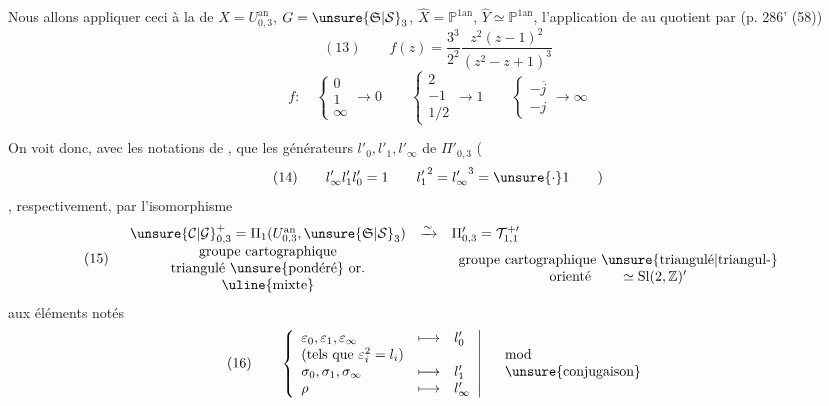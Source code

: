 Nous allons appliquer ceci à la  de
$X=U_{0,3}^{\mathrm{an}}$, $G=\unsure{\mathfrak{S}|\mathcal{S}}_3$,
$\widehat{X}=\mathbb{P}^{1\mathrm{an}}$, $\widehat{Y}\simeq\mathbb{P}^{1\mathrm{an}}$,
 l'application de  au quotient
 par (p. 286' (58))
\[
(13)\qquad
f(z)=\frac{3^3}{2^2}\frac{z^2(z-1)^2}{(z^2-z+1)^3}
\]
\[
f:\quad
\left\{\begin{array}{l}0\\1\\\infty\end{array}\right.\longrightarrow 0
\qquad
\left\{\begin{array}{l}2\\-1\\1/2\end{array}\right.\longrightarrow 1
\qquad
\left\{\begin{array}{l}-\overline{j}\\-j\end{array}\right.\longrightarrow\infty
\]

On voit donc, avec les notations de \hspace{3em}, que les générateurs
$l'_0,l'_1,l'_\infty$ de $\Pi'_{0,3}$
(
\[
(14)\qquad l'_\infty l'_1 l'_0=1
\qquad {l'_1}^{2}={l'_\infty}^{3}=\unsure{\cdot}1\qquad )
\]
, respectivement, par l'isomorphisme
\[
(15)\quad
\begin{array}{ccl}
\unsure{\mathcal{C}|\mathcal{G}}_{0,3}^{+}
=\Pi_1(U_{0,3}^{\mathrm{an}},\unsure{\mathfrak{S}|\mathcal{S}}_3)
&\xrightarrow{\sim}&\Pi'_{0,3}=\mathcal{T}_{1,1}^{+\prime}\\
\begin{array}{c}
\text{groupe cartographique}\\
\text{triangulé \unsure{pondéré} or.}\\
\text{\uline{mixte}}
\end{array}
&&\begin{array}{c}
\text{groupe cartographique \unsure{triangulé|triangul-}}\\
\text{orienté}\qquad \simeq\mathrm{Sl}(2,\mathbb{Z})'
\end{array}
\end{array}
\]
aux éléments notés
\[
(16)\qquad
\left\{\begin{array}{lll}
\varepsilon_0,\varepsilon_1,\varepsilon_\infty&\longmapsto&l'_0\\
\text{(tels que $\varepsilon_i^2=l_i$)}&&\\
\sigma_0,\sigma_1,\sigma_\infty&\longmapsto&l'_1\\
\rho&\longmapsto&l'_\infty
\end{array}\right|\quad
\begin{array}{l}\mathrm{mod}\\\text{\unsure{conjugaison}}\end{array}
\]

